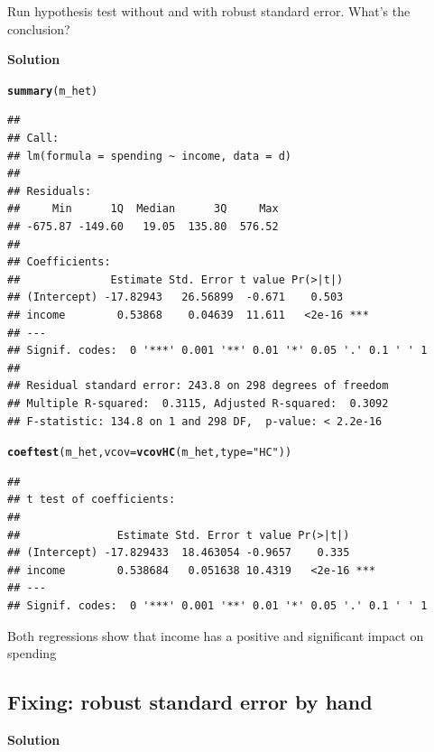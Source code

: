 \documentclass{article}\usepackage[]{graphicx}\usepackage[]{color}
\makeatletter
\newcommand{\hlstr}[1]{\textcolor[rgb]{0.192,0.494,0.8}{#1}}%
\newcommand{\hlstd}[1]{\textcolor[rgb]{0.345,0.345,0.345}{#1}}%
\newcommand{\hlkwc}[1]{\textcolor[rgb]{0.333,0.667,0.333}{#1}}%
\newcommand{\hlkwd}[1]{\textcolor[rgb]{0.737,0.353,0.396}{\textbf{#1}}}%
\newenvironment{kframe}{%
 \def\at@end@of@kframe{}%
 \ifinner\ifhmode%
  \def\at@end@of@kframe{\end{minipage}}%
  \begin{minipage}{\columnwidth}%
 \fi\fi%
 \def\FrameCommand##1{\hskip\@totalleftmargin \hskip-\fboxsep
 \colorbox{shadecolor}{##1}\hskip-\fboxsep
     \hskip-\linewidth \hskip-\@totalleftmargin \hskip\columnwidth}%
 \MakeFramed {\advance\hsize-\width
   \@totalleftmargin\z@ \linewidth\hsize
   \@setminipage}}%
 {\par\unskip\endMakeFramed%
 \at@end@of@kframe}
\newenvironment{knitrout}{}{} %
\makeatother
\begin{document}
Run hypothesis test without and with robust standard error. What's the conclusion?

\textbf{Solution}

\begin{knitrout}
\color{fgcolor}\begin{kframe}
\begin{alltt}
\hlkwd{summary}\hlstd{(m_het)}
\end{alltt}
\begin{verbatim}
## 
## Call:
## lm(formula = spending ~ income, data = d)
## 
## Residuals:
##     Min      1Q  Median      3Q     Max 
## -675.87 -149.60   19.05  135.80  576.52 
## 
## Coefficients:
##              Estimate Std. Error t value Pr(>|t|)    
## (Intercept) -17.82943   26.56899  -0.671    0.503    
## income        0.53868    0.04639  11.611   <2e-16 ***
## ---
## Signif. codes:  0 '***' 0.001 '**' 0.01 '*' 0.05 '.' 0.1 ' ' 1
## 
## Residual standard error: 243.8 on 298 degrees of freedom
## Multiple R-squared:  0.3115,	Adjusted R-squared:  0.3092 
## F-statistic: 134.8 on 1 and 298 DF,  p-value: < 2.2e-16
\end{verbatim}
\begin{alltt}
\hlkwd{coeftest}\hlstd{(m_het,} \hlkwc{vcov} \hlstd{=} \hlkwd{vcovHC}\hlstd{(m_het,} \hlkwc{type} \hlstd{=} \hlstr{"HC"}\hlstd{))}
\end{alltt}
\begin{verbatim}
## 
## t test of coefficients:
## 
##               Estimate Std. Error t value Pr(>|t|)    
## (Intercept) -17.829433  18.463054 -0.9657    0.335    
## income        0.538684   0.051638 10.4319   <2e-16 ***
## ---
## Signif. codes:  0 '***' 0.001 '**' 0.01 '*' 0.05 '.' 0.1 ' ' 1
\end{verbatim}
\end{kframe}
\end{knitrout}

Both regressions show that income has a positive and significant impact on spending

\subsection{Fixing: robust standard error by hand}

\textbf{Solution}
\end{document}
